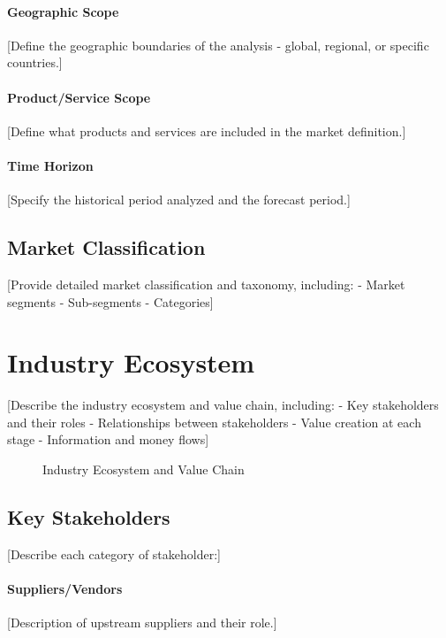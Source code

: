 \documentclass[11pt,letterpaper]{report}
\begin{document}
\paragraph{Geographic Scope}
[Define the geographic boundaries of the analysis - global, regional, or specific countries.]

\paragraph{Product/Service Scope}
[Define what products and services are included in the market definition.]

\paragraph{Time Horizon}
[Specify the historical period analyzed and the forecast period.]

\subsection{Market Classification}

[Provide detailed market classification and taxonomy, including:
- Market segments
- Sub-segments
- Categories]

\section{Industry Ecosystem}


[Describe the industry ecosystem and value chain, including:
- Key stakeholders and their roles
- Relationships between stakeholders
- Value creation at each stage
- Information and money flows]

\begin{figure}[htbp]
\centering
\caption{Industry Ecosystem and Value Chain}
\label{fig:ecosystem}
\end{figure}

\subsection{Key Stakeholders}

[Describe each category of stakeholder:]

\paragraph{Suppliers/Vendors}
[Description of upstream suppliers and their role.]
\end{document}
